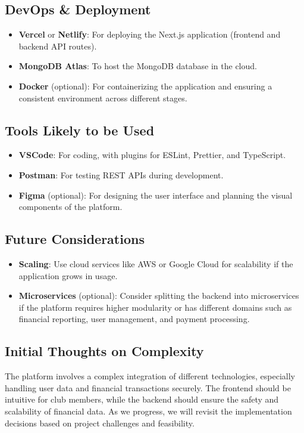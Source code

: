 \documentclass{article}
\begin{document}
\subsection{DevOps \& Deployment}
\begin{itemize}
  \item \textbf{Vercel} or \textbf{Netlify}: For deploying the Next.js application (frontend and backend API routes).
  \item \textbf{MongoDB Atlas}: To host the MongoDB database in the cloud.
  \item \textbf{Docker} (optional): For containerizing the application and ensuring a consistent environment across different stages.
\end{itemize}

\subsection{Tools Likely to be Used}
\begin{itemize}
  \item \textbf{VSCode}: For coding, with plugins for ESLint, Prettier, and TypeScript.
  \item \textbf{Postman}: For testing REST APIs during development.
  \item \textbf{Figma} (optional): For designing the user interface and planning the visual components of the platform.
\end{itemize}

\subsection{Future Considerations}
\begin{itemize}
  \item \textbf{Scaling}: Use cloud services like AWS or Google Cloud for scalability if the application grows in usage.
  \item \textbf{Microservices} (optional): Consider splitting the backend into microservices if the platform requires higher modularity or has different domains such as financial reporting, user management, and payment processing.
\end{itemize}

\subsection{Initial Thoughts on Complexity}
The platform involves a complex integration of different technologies, especially handling user data and financial transactions securely. The frontend should be intuitive for club members, while the backend should ensure the safety and scalability of financial data. As we progress, we will revisit the implementation decisions based on project challenges and feasibility.
\end{document}

